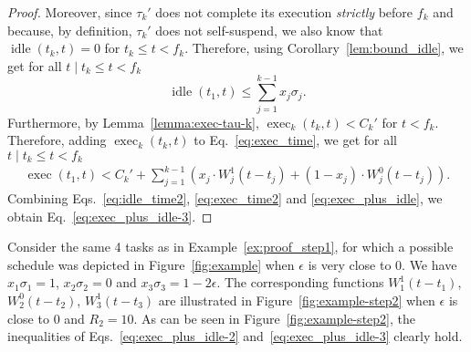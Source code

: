 \begin{proof}
Moreover, since $\tau_k'$ does not complete its execution
\emph{strictly} before $f_k$ and because, by definition, $\tau_k'$
does not self-suspend, we also know that $\operatorname{idle}(t_k, t) = 0$ for $t_k \leq t < f_k$. Therefore, using Corollary~\ref{lem:bound_idle}, we get for all $t \mid t_k \leq t < f_k$ 
\begin{equation}
\label{eq:idle_time2}
\operatorname{idle}(t_1, t) \leq \sum_{j=1}^{k-1}
x_j \sigma_j.
\end{equation}
Furthermore, by Lemma~\ref{lemma:exec-tau-k}, $\operatorname{exec}_k(t_k, t) < C_k'$ for $t < f_k$. Therefore, adding $\operatorname{exec}_k(t_k, t)$ to Eq.~\eqref{eq:exec_time}, we get for all $t \mid t_{k} \leq t < f_k$ 
{\footnotesize \begin{align}
\label{eq:exec_time2}
\operatorname{exec}(t_1, t) < C_k' + \sum_{j=1}^{k-1} \left( x_j\cdot W_j^1(t-t_j)  + (1-x_j)\cdot W_j^0(t-t_j) \right).
\end{align}}
Combining Eqs.~\eqref{eq:idle_time2}, \eqref{eq:exec_time2} and \eqref{eq:exec_plus_idle}, we obtain Eq.~\eqref{eq:exec_plus_idle-3}.
\end{proof}




\begin{example}
Consider the same 4 tasks as in Example~\ref{ex:proof_step1}, for which a possible schedule was depicted in Figure~\ref{fig:example} when $\epsilon$ is very close to $0$. We have $x_1\sigma_1=1$, $x_2\sigma_2=0$ and $x_3\sigma_3=1-2\epsilon$. The corresponding functions
$W_1^1(t-t_1)$, $W_2^0(t-t_2)$, $W_3^1(t-t_3)$ are illustrated in
Figure~\ref{fig:example-step2} when $\epsilon$ is close to $0$ and $R_2 = 10$. 
As can be seen in Figure~\ref{fig:example-step2}, the inequalities of Eqs.~\eqref{eq:exec_plus_idle-2} and~\eqref{eq:exec_plus_idle-3} clearly hold.\myendproof
\end{example}


